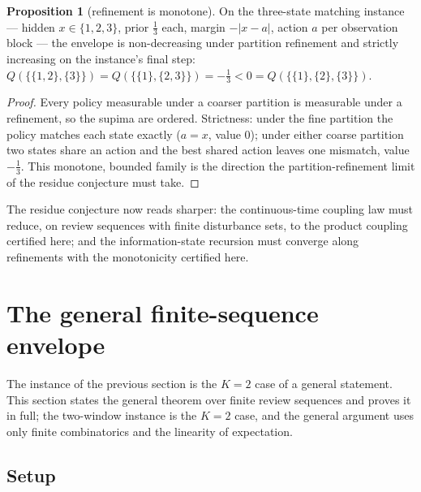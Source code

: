 \documentclass[10pt,twocolumn]{article}
\theoremstyle{definition}
\newtheorem{proposition}{Proposition}
\begin{document}
\begin{proposition}[refinement is monotone]\label{prop:refine}
On the three-state matching instance --- hidden $x \in \{1,2,3\}$, prior
$\tfrac13$ each, margin $-|x - a|$, action $a$ per observation block ---
the envelope is non-decreasing under partition refinement and strictly
increasing on the instance's final step:
$Q(\{\{1,2\},\{3\}\}) = Q(\{\{1\},\{2,3\}\}) = -\tfrac13
< 0 = Q(\{\{1\},\{2\},\{3\}\})$.
\end{proposition}
\begin{proof}
Every policy measurable under a coarser partition is measurable under a
refinement, so the supima are ordered. Strictness: under the fine
partition the policy matches each state exactly ($a = x$, value $0$);
under either coarse partition two states share an action and the best
shared action leaves one mismatch, value $-\tfrac13$. This monotone,
bounded family is the direction the partition-refinement limit of the
residue conjecture must take.
\end{proof}

The residue conjecture now reads sharper: the continuous-time coupling
law must reduce, on review sequences with finite disturbance sets, to
the product coupling certified here; and the information-state recursion
must converge along refinements with the monotonicity certified here.

\section{The general finite-sequence envelope}

The instance of the previous section is the $K = 2$ case of a general
statement. This section states the general theorem over finite review
sequences and proves it in full; the two-window instance is the $K = 2$ case, and the general argument uses only finite combinatorics and the linearity of expectation.

\subsection{Setup}
\end{document}

